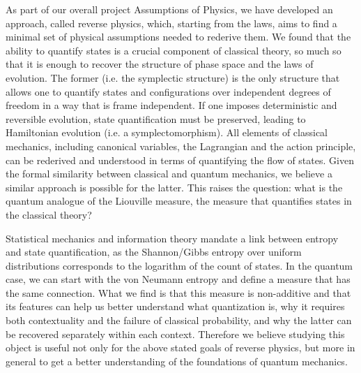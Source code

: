 \documentclass[10pt,twocolumn, nofootinbib]{revtex4-2}
\begin{document}
As part of our overall project Assumptions of Physics,\cite{aop-book} we have developed an approach, called reverse physics,\cite{aop-phys-ReversePhysics} which, starting from the laws, aims to find a minimal set of physical assumptions needed to rederive them. We found that the ability to quantify states is a crucial component of classical theory, so much so that it is enough to recover the structure of phase space and the laws of evolution.\cite{aop-phil-Hamiltonianinformation,aop-phil-HamiltonianPrivilege} The former (i.e. the symplectic structure) is the only structure that allows one to quantify states and configurations over independent degrees of freedom in a way that is frame independent. If one imposes deterministic and reversible evolution, state quantification must be preserved, leading to Hamiltonian evolution (i.e. a symplectomorphism). All elements of classical mechanics, including canonical variables, the Lagrangian and the action principle, \cite{aop-phys-ActionPrincipleInterpretation} can be rederived and understood in terms of quantifying the flow of states. Given the formal similarity between classical and quantum mechanics, we believe a similar approach is possible for the latter. This raises the question: what is the quantum analogue of the Liouville measure, the measure that quantifies states in the classical theory?

Statistical mechanics and information theory mandate a link between entropy and state quantification, as the Shannon/Gibbs entropy over uniform distributions corresponds to the logarithm of the count of states. In the quantum case, we can start with the von Neumann entropy and define a measure that has the same connection. What we find is that this measure is non-additive and that its features can help us better understand what quantization is, why it requires both contextuality and the failure of classical probability, and why the latter can be recovered separately within each context. Therefore we believe studying this object is useful not only for the above stated goals of reverse physics, but more in general to get a better understanding of the foundations of quantum mechanics.
\end{document}
